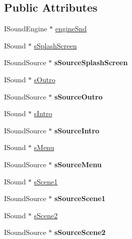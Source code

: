\subsection*{Public Attributes}
\begin{DoxyCompactItemize}
\item 
ISoundEngine $\ast$ \hyperlink{class_sound_afbc43d3c59583a6ae5d0fb511f31448d}{engineSnd}
\item 
ISound $\ast$ \hyperlink{class_sound_abb073c6731d173ea6d885a86d1ee508c}{sSplashScreen}
\item 
\hypertarget{class_sound_ae92a55acbd55e7fed8e9765c5a55daa5}{
ISoundSource $\ast$ {\bfseries sSourceSplashScreen}}
\label{class_sound_ae92a55acbd55e7fed8e9765c5a55daa5}

\item 
ISound $\ast$ \hyperlink{class_sound_ace8a859201daf162e878975fc224202f}{sOutro}
\item 
\hypertarget{class_sound_af1919a733ce38ab4f5ed2f192db91f58}{
ISoundSource $\ast$ {\bfseries sSourceOutro}}
\label{class_sound_af1919a733ce38ab4f5ed2f192db91f58}

\item 
ISound $\ast$ \hyperlink{class_sound_a0dde397779cc020d93c28aa98b2ba942}{sIntro}
\item 
\hypertarget{class_sound_a4c699efee8db2e4386a8b9950fec7327}{
ISoundSource $\ast$ {\bfseries sSourceIntro}}
\label{class_sound_a4c699efee8db2e4386a8b9950fec7327}

\item 
ISound $\ast$ \hyperlink{class_sound_a5fdb025b096d4b60089b00143cc9d7c8}{sMenu}
\item 
\hypertarget{class_sound_a4658de48516497dd20c543b60ad49105}{
ISoundSource $\ast$ {\bfseries sSourceMenu}}
\label{class_sound_a4658de48516497dd20c543b60ad49105}

\item 
ISound $\ast$ \hyperlink{class_sound_a77990d3d0d401582f3d3fc291d6c05a2}{sScene1}
\item 
\hypertarget{class_sound_a6ac41c27bea86237dddd19136fb63f79}{
ISoundSource $\ast$ {\bfseries sSourceScene1}}
\label{class_sound_a6ac41c27bea86237dddd19136fb63f79}

\item 
ISound $\ast$ \hyperlink{class_sound_a9316f922062f2aada3c4d83088bb21e6}{sScene2}
\item 
\hypertarget{class_sound_a4c54226e30f0e5d673105c0f5538d3b2}{
ISoundSource $\ast$ {\bfseries sSourceScene2}}
\label{class_sound_a4c54226e30f0e5d673105c0f5538d3b2}


\end{DoxyCompactItemize}
